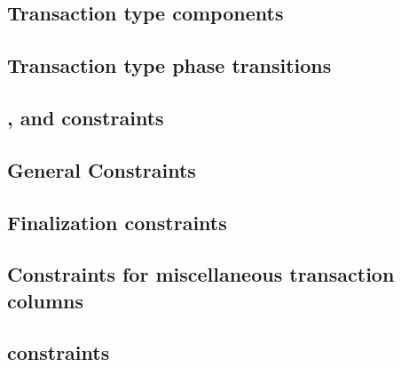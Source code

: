 \subsection{Transaction type \rlp{} components}                                   \label{rlp txn v2: generalities: transaction type rlp components}    
\subsection{Transaction type phase transitions}                                   \label{rlp txn v2: generalities: admissible rlp component flags}     
\subsection{\lc{}, \lx{} and \lt{} constraints}                                   \label{rlp txn v2: generalities: lc lt and lx constraints}           
\subsection{General Constraints}                                                  \label{rlp txn v2: generalities: indices and limb constructed}       
\subsection{Finalization constraints}                                             \label{rlp txn v2: generalities: heartbeat}                          
\subsection{Constraints for miscellaneous transaction columns}                    \label{rlp txn v2: generalities: miscellaneous txn columns}          
\subsection{ constraints}  \label{rlp txn v2: generalities: TMP k column generalities}          
